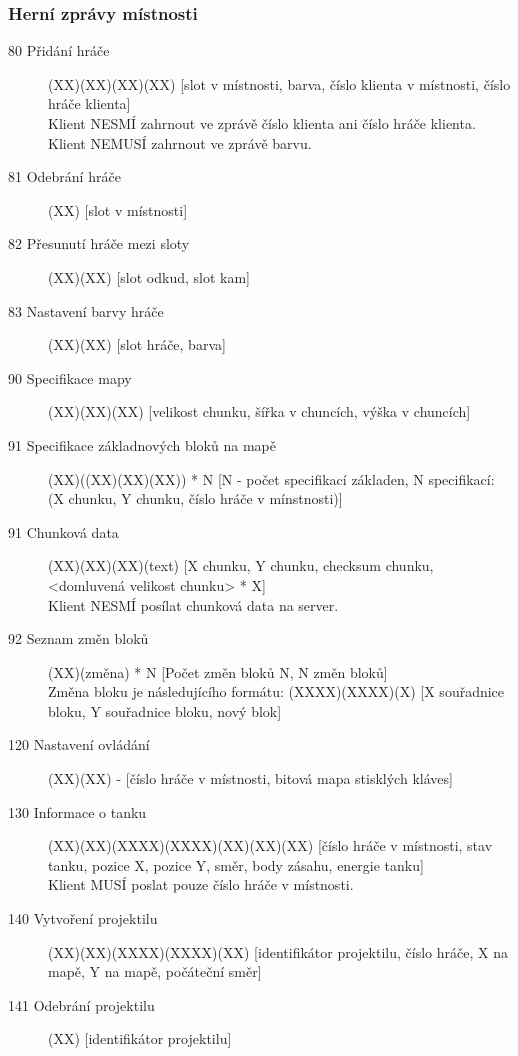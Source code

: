 \documentclass[12pt,a4paper]{article}
\begin{document}
\subsubsection*{Herní zprávy místnosti}
\begin{description}
\item[80 Přidání hráče] (XX)(XX)(XX)(XX) [slot v místnosti, barva, číslo klienta v místnosti, číslo hráče klienta] \\
Klient NESMÍ zahrnout ve zprávě číslo klienta ani číslo hráče klienta. Klient NEMUSÍ zahrnout ve zprávě barvu.
\item[81 Odebrání hráče] (XX) [slot v místnosti]
\item[82 Přesunutí hráče mezi sloty] (XX)(XX) [slot odkud, slot kam]
\item[83 Nastavení barvy hráče] (XX)(XX) [slot hráče, barva]

\item[90 Specifikace mapy] (XX)(XX)(XX) [velikost chunku, šířka v chuncích, výška v chuncích]
\item[91 Specifikace základnových bloků na mapě] (XX)((XX)(XX)(XX)) * N [N - počet specifikací základen, N specifikací: (X chunku, Y chunku, číslo hráče v mínstnosti)]
\item[91 Chunková data] (XX)(XX)(XX)(text) [X chunku, Y chunku, checksum chunku, <domluvená velikost chunku> * X]\\
Klient NESMÍ posílat chunková data na server.
\item[92 Seznam změn bloků] (XX)(změna) * N [Počet změn bloků N, N změn bloků]\\ 
Změna bloku je následujícího formátu: (XXXX)(XXXX)(X) [X souřadnice bloku, Y souřadnice bloku, nový blok]

\item[120 Nastavení ovládání] (XX)(XX) - [číslo hráče v místnosti, bitová mapa stisklých kláves]
\item[130 Informace o tanku] (XX)(XX)(XXXX)(XXXX)(XX)(XX)(XX) [číslo hráče v místnosti, stav tanku, pozice X, pozice Y, směr, body zásahu, energie tanku] \\
Klient MUSÍ poslat pouze číslo hráče v místnosti.
\item[140 Vytvoření projektilu] (XX)(XX)(XXXX)(XXXX)(XX) [identifikátor projektilu, číslo hráče, X na mapě, Y na mapě, počáteční směr]
\item[141 Odebrání projektilu] (XX) [identifikátor projektilu]
\end{description}




\end{document}
